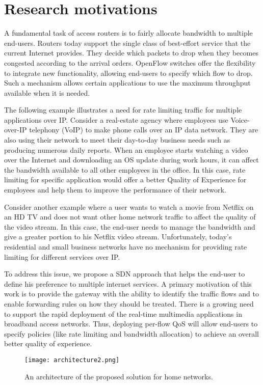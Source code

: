 \section{Research motivations}
A fundamental task of access routers is to fairly allocate bandwidth to multiple end-users. Routers today support the single class of best-effort service that the current Internet provides. They decide which packets to drop when they becomes congested according to the arrival orders. OpenFlow switches offer the flexibility to integrate new functionality, allowing end-users to specify which flow to drop. Such a mechanism allows certain applications to use the maximum throughput available when it is needed.

The following example illustrates a need for rate limiting traffic for multiple applications over IP. Consider a real-estate agency where employees use Voice-over-IP telephony (VoIP) to make phone calls over an IP data network. They are also using their network to meet their day-to-day business needs such as producing numerous daily reports. When an employee starts watching a video over the Internet and downloading an OS update during work hours, it can affect the bandwidth available to all other employees in the office. In this case, rate limiting for specific application would offer a better Quality of Experience for employees and help them to improve the performance of their network. 

Consider another example where a user wants to watch a movie from Netflix on an HD TV and does not want other home network traffic to affect the quality of the video stream. In this case, the end-user needs to manage the bandwidth and give a greater portion to his Netflix video stream. Unfortunately, today's residential and small business networks have no mechanism for providing rate limiting for different services over IP. 

To address this issue, we propose a SDN approach that helps the end-user to define his preference to multiple internet services. A primary motivation of this work is to provide the gateway with the ability to identify the traffic flows and to enable forwarding rules on how they should be treated. There is a growing need to support the rapid deployment of the real-time multimedia applications in broadband access networks. Thus, deploying per-flow QoS will allow end-users to specify policies (like rate limiting and bandwidth allocation) to achieve an overall better quality of experience.

\begin{figure}[!ht]
\begin{center}
    \texttt{[image: architecture2.png]}
\end{center}
\caption{An architecture of the proposed solution for home networks.}
\label{fig:sim}
\end{figure}

